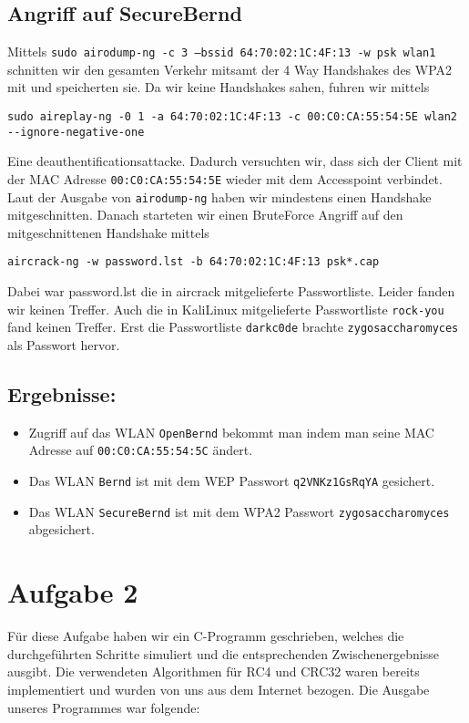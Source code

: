 \documentclass[10pt,a4paper]{article}
\begin{document}
\subsection{Angriff auf SecureBernd}

Mittels \texttt{sudo airodump-ng -c 3 --bssid 64:70:02:1C:4F:13 -w psk wlan1} schnitten wir den gesamten Verkehr mitsamt der 4 Way Handshakes des WPA2 mit und speicherten sie. Da wir keine Handshakes sahen, fuhren wir mittels 
\begin{verbatim}
sudo aireplay-ng -0 1 -a 64:70:02:1C:4F:13 -c 00:C0:CA:55:54:5E wlan2 --ignore-negative-one
\end{verbatim}
Eine deauthentificationsattacke. Dadurch versuchten wir, dass sich der Client mit der MAC Adresse
\texttt{00:C0:CA:55:54:5E} wieder mit dem Accesspoint verbindet. Laut der Ausgabe von \texttt{airodump-ng} haben wir mindestens einen Handshake mitgeschnitten.
Danach starteten wir einen BruteForce Angriff auf den mitgeschnittenen Handshake mittels
\begin{verbatim}
aircrack-ng -w password.lst -b 64:70:02:1C:4F:13 psk*.cap
\end{verbatim}
Dabei war password.lst die in aircrack mitgelieferte Passwortliste. Leider fanden wir keinen Treffer. Auch die in KaliLinux mitgelieferte Passwortliste \texttt{rock-you} fand keinen Treffer. Erst die Passwortliste \texttt{darkc0de} brachte \texttt{zygosaccharomyces} als Passwort hervor.


\subsection{Ergebnisse:}
\begin{itemize}
	\item Zugriff auf das WLAN \texttt{OpenBernd} bekommt man indem man seine MAC Adresse auf \texttt{00:C0:CA:55:54:5C} ändert.
	\item Das WLAN \texttt{Bernd} ist mit dem WEP Passwort \texttt{q2VNKz1GsRqYA} gesichert.
	\item Das WLAN \texttt{SecureBernd} ist mit dem WPA2 Passwort \texttt{zygosaccharomyces} abgesichert.
\end{itemize}



\section{Aufgabe 2}

Für diese Aufgabe haben wir ein C-Programm geschrieben, welches die durchgeführten Schritte simuliert und die entsprechenden Zwischenergebnisse ausgibt. Die verwendeten Algorithmen für RC4 und CRC32 waren bereits implementiert und wurden von uns aus dem Internet bezogen. Die Ausgabe unseres Programmes war folgende:
\end{document}

